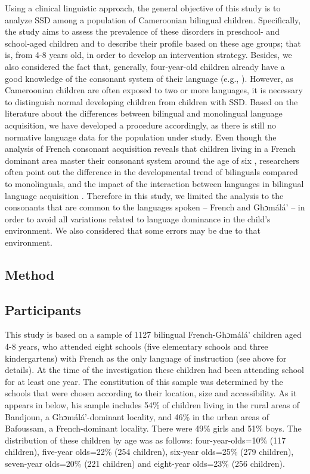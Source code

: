 \documentclass[output=paper,newtxmath,modfonts,nonflat,draftmode]{langsci/langscibook}
\begin{document}
Using a clinical linguistic approach, the general objective of this study is to analyze SSD among a population of Cameroonian bilingual children. Specifically, the study aims to assess the prevalence of these disorders in preschool- and school-aged children and to describe their profile based on these age groups; that is, from 4-8 years old, in order to develop an intervention strategy. Besides, we also considered the fact that, generally, four-year-old children already have a good knowledge of the consonant system of their language (e.g., \citealt{MacLeodEtAl2011}). However, as Cameroonian children are often exposed to two or more languages, it is necessary to distinguish normal developing children from children with SSD. Based on the literature about the differences between bilingual and monolingual language acquisition, we have developed a procedure accordingly, as there is still no normative language data for the population under study. Even though the analysis of French consonant acquisition reveals that children living in a French dominant area master their consonant system around the age of six \cite{Rvachew2013}, researchers often point out the difference in the developmental trend of bilinguals compared to monolinguals, and the impact of the interaction between languages in bilingual language acquisition \cite{Paradis2011}. Therefore in this study, we limited the analysis to the consonants that are common to the languages spoken – French and Ghɔmálá’ – in order to avoid all variations related to language dominance in the child’s environment. We also considered that some errors may be due to that environment. 

\subsection{Method} %

\subsection{Participants}

This study is based on a sample of 1127 bilingual French-Ghɔmálá’ children aged 4-8 years, who attended eight schools (five elementary schools and three kindergartens) with French as the only language of instruction (see  above for details). At the time of the investigation these children had been attending school for at least one year. The constitution of this sample was determined by the schools that were chosen according to their location, size and accessibility. As it appears in  below, his sample includes 54\% of children living in the rural areas of Bandjoun, a Ghɔmálá’-dominant locality, and 46\% in the urban areas of Bafoussam, a French-dominant locality. There were 49\% girls and 51\% boys. The distribution of these children by age was as follows: four-year-olds=10\% (117 children), five-year olds=22\% (254 children), six-year olds=25\% (279 children), seven-year olds=20\% (221 children) and eight-year olds=23\% (256 children).
\end{document}

